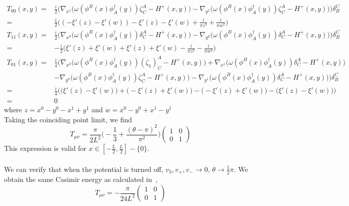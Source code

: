 \begin{equation}\label{vacuum-stressenergy}
\begin{split}
T_{00}(x,y) = 
& \frac{i}{2}\Big(\nabla_{x^1} \big( \omega(\phi^B(x) \phi^\dagger_A(y))\zeta^A_C - H^+(x,y) \big)
- \nabla_{y^1} \big( \omega( \phi^B(x) \phi^\dagger_A(y))\zeta^A_C - H^+(x,y) \big)
\Big)\delta_B^C  \\
= & \frac{i}{2} \big( (-\xi'(z) - \xi'(w)) - \xi'(z) - \xi'(w) + \frac{i}{\pi z^2} + \frac{i}{\pi w^2} \big)   \\
T_{11}(x,y) =
& \frac{i}{2}\Big(\nabla_{x^0} \big( \omega(\phi^B(x) \phi^\dagger_A(y))\delta^A_C - H^+(x,y) \big)
- \nabla_{y^0} \big( \omega( \phi^B(x) \phi^\dagger_A(y))\delta^A_C - H^+(x,y) \big)
\Big)\delta_B^C  \\
= & - \frac{i}{2}\big( \xi'(z) + \xi'(w) + \xi'(z) + \xi'(w) - \frac{i}{\pi z^2} - \frac{i}{\pi w^2}\big) \\
T_{01}(x,y) = 
& \frac{i}{4}\Big(\nabla_{x^0} \big( \omega(\phi^B(x) \phi^\dagger_A(y))(\zeta_1)^A_C - H^+(x,y) \big) + \nabla_{x^1} \big( \omega(\phi^B(x) \phi^\dagger_A(y))\delta^A_C - H^+(x,y) \big)  \\
& - \nabla_{y^0} \big( \omega( \phi^B(x) \phi^\dagger_A(y))\zeta^A_C - H^+(x,y) \big)
- \nabla_{y^1} \big( \omega( \phi^B(x) \phi^\dagger_A(y))\delta^A_C - H^+(x,y) \big)
\Big)\delta_B^C \\
= & \frac{i}{4}\Big( \big( \xi'(z) - \xi'(w) \big) + \big(- \xi'(z) + \xi'(w) \big) - \big( - \xi'(z) + \xi'(w) \big) - \big( \xi'(z) - \xi'(w) \big) \Big) \\
= & 0
\end{split}
\end{equation}
where $z = x^0 - y^0 - x^1 + y^1$ and $w = x^0 - y^0 + x^1 - y^1$ \\
Taking the coinciding point limit, we find
\begin{equation*}
T_{\mu\nu} = \frac{ \pi}{2 L^2} \big( -\frac{1}{3} + \frac{(\theta - \pi)^2}{\pi^2}\big)\begin{pmatrix}
1  & 0 \\ 0  &  1
\end{pmatrix}
\end{equation*}
This expression is valid for $x\in[-\frac L 2 , \frac L 2] - \{0\}$.\\\\
%
We can verify that when the potential is turned off, \ie $v_3, v_+, v_- \rightarrow 0$, $\theta \rightarrow \frac 1 2 \pi$.
We obtain the same Casimir energy as calculated in~\cite{Sundberg2003}, \ie
\begin{equation*}
T_{\mu\nu} = -\frac{\pi}{24L^2}\begin{pmatrix} 1 & 0 \\ 0 & 1\end{pmatrix}
\end{equation*}













